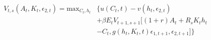 \begin{align}
      V_{t,s}(A_t,K_t,\epsilon_{2,t})=\text{max}_{C_t,h_t} & \{u(C_t,t)-v(h_t, \epsilon_{2,t}) \\ & + \beta E_t V_{t+1,s+1}[(1+r)A_t + R_s K_t h_t \\ & -C_t, g(h_t,K_t,t)\epsilon_{1,t+1}, \epsilon_{2,t+1}]\}
  \end{align}